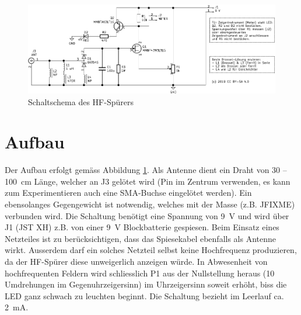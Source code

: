 \documentclass[a4paper,11pt,halfparskip,smallheadings,DIV=10]{scrartcl}
\begin{document}
\begin{figure}
\includegraphics[width=\textwidth]{schaltung.pdf}
\caption{Schaltschema des HF-Spürers}
\label{fig:schematic}
\end{figure}

\section{Aufbau}
Der Aufbau erfolgt gemäss Abbildung \ref{fig:schematic}. Als Antenne dient ein
Draht von 30 -- 100~cm Länge, welcher an J3 gelötet wird (Pin im Zentrum
verwenden, es kann zum Experimentieren auch eine SMA-Buchse eingelötet werden).
Ein ebensolanges Gegengewicht ist notwendig, welches mit der Masse (z.B. JFIXME)
verbunden wird. Die Schaltung benötigt eine Spannung von 9~V und wird über J1 
(JST XH) z.B. von einer 9~V Blockbatterie gespiesen. Beim Einsatz eines
Netzteiles ist zu berücksichtigen, dass das Spiesekabel ebenfalls als Antenne
wirkt. Ausserdem darf ein solches Netzteil selbst keine Hochfrequenz produzieren,
da der HF-Spürer diese unweigerlich anzeigen würde. In Abwesenheit von
hochfrequenten Feldern wird schliesslich P1 aus der Nullstellung heraus (10 
Umdrehungen im Gegenuhrzeigersinn) im Uhrzeigersinn soweit erhöht, biss die LED
ganz schwach zu leuchten beginnt. Die Schaltung bezieht im Leerlauf ca. 2~mA.


\end{document}
